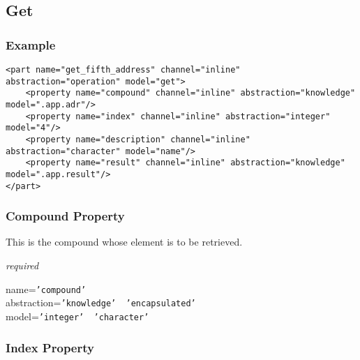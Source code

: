%
%
%
%
%
%

\subsection{Get}
\label{get_heading}

\subsubsection{Example}

\begin{scriptsize}
    \begin{verbatim}
<part name="get_fifth_address" channel="inline" abstraction="operation" model="get">
    <property name="compound" channel="inline" abstraction="knowledge" model=".app.adr"/>
    <property name="index" channel="inline" abstraction="integer" model="4"/>
    <property name="description" channel="inline" abstraction="character" model="name"/>
    <property name="result" channel="inline" abstraction="knowledge" model=".app.result"/>
</part>
    \end{verbatim}
\end{scriptsize}

\subsubsection{Compound Property}

This is the compound whose element is to be retrieved.

\emph{required}

name=\texttt{'compound'}\\
abstraction=\texttt{'knowledge' \vline\ 'encapsulated'}\\
model=\texttt{'integer' \vline\ 'character'}

\subsubsection{Index Property}

